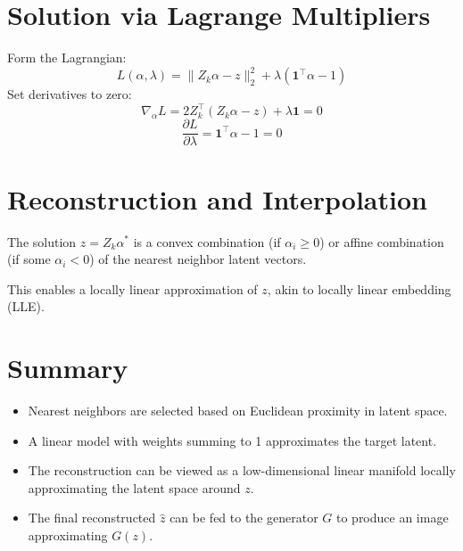 \documentclass[a4paper,12pt]{article}
\begin{document}
\section{Solution via Lagrange Multipliers}
Form the Lagrangian:
\[
L(\alpha, \lambda) = \|Z_k \alpha - z\|_2^2 + \lambda (\mathbf{1}^\top \alpha - 1)
\]
Set derivatives to zero:
\[
\nabla_\alpha L = 2 Z_k^\top (Z_k \alpha - z) + \lambda \mathbf{1} = 0
\]
\[
\frac{\partial L}{\partial \lambda} = \mathbf{1}^\top \alpha - 1 = 0
\]

\section{Reconstruction and Interpolation}
The solution $\hat{z} = Z_k \alpha^*$ is a convex combination (if $\alpha_i \geq 0$) or affine combination (if some $\alpha_i < 0$) of the nearest neighbor latent vectors.

This enables a locally linear approximation of $z$, akin to locally linear embedding (LLE).

\section{Summary}
\begin{itemize}
    \item Nearest neighbors are selected based on Euclidean proximity in latent space.
    \item A linear model with weights summing to 1 approximates the target latent.
    \item The reconstruction can be viewed as a low-dimensional linear manifold locally approximating the latent space around $z$.
    \item The final reconstructed $\hat{z}$ can be fed to the generator $G$ to produce an image approximating $G(z)$.
\end{itemize}

\end{document}
